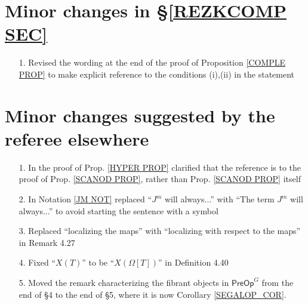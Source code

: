 \documentclass{article}
\begin{document}
\section{Minor changes in \S \ref{REZKCOMP SEC}}
 

\begin{itemize}
	\item[1.]
	Revised the wording at the end of the proof of 
	Proposition \ref{COMPLE PROP}
	to make explicit reference to the conditions (i),(ii)
	in the statement
\end{itemize}



\section{Minor changes suggested by the referee elsewhere}


\begin{itemize}
	\item[1.] In the proof of Prop. \ref{HYPER PROP} clarified that the reference is to the proof of Prop. \ref{SCANOD PROP}, rather than Prop. \ref{SCANOD PROP} itself
	\item[2.] In Notation \ref{JM NOT}
	replaced ``$J^m$ will always...'' with
	``The term $J^m$ will always...''
	to avoid starting the sentence with a symbol
	\item[3.] Replaced ``localizing the maps'' with ``localizing with respect to the maps'' in Remark 4.27
	\item[4.] Fixed ``$X(T)$'' to be ``$X(\Omega[T])$''
	in Definition 4.40
	\item[5.] Moved the remark characterizing the fibrant objects in
	$\mathsf{PreOp}^G$ from the end of \S 4 to the end of \S 5,
	where it is now Corollary \ref{SEGALOP_COR}.
\end{itemize}




{}


\end{document}
